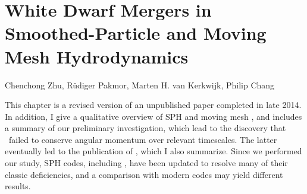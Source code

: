 \chapter{White Dwarf Mergers in Smoothed-Particle and Moving Mesh Hydrodynamics}

\begin{center}
\begin{minipage}[c]{4.75in}
Chenchong Zhu, R\"{u}diger Pakmor, Marten H. van Kerkwijk, Philip Chang\\
\vspace{2em}
\end{minipage}
\end{center}

This chapter is a revised version of an unpublished paper completed in late 2014.  In addition, I give a qualitative overview of SPH and moving mesh \arepo, and includes a summary of our preliminary investigation, which lead to the discovery that \arepo\ failed to conserve angular momentum over relevant timescales.  The latter eventually led to the publication of \cite{pakm+16}, which I also summarize.  Since we performed our study, SPH codes, including \gasoline, have been updated to resolve many of their classic deficiencies, and a comparison with modern codes may yield different results.
